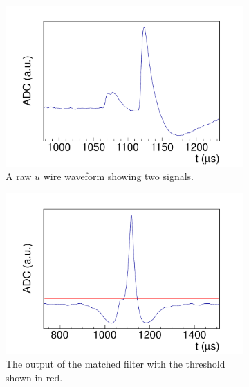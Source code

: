 \documentclass[herrin-thesis.tex]{subfiles}
\begin{document}
\begin{figure}
	\centering
	\begin{subfigure}[b]{0.48\textwidth}
		\centering
		\includegraphics[width=\textwidth]{./plots/data_signal_finding_raw.pdf}
		\caption[Raw \(u\) wire waveform]{A raw \(u\) wire waveform showing two signals.}
		\label{fig:data_signal_finding_raw}
	\end{subfigure}\hfill%
	\begin{subfigure}[b]{0.48\textwidth}
		\centering
		\includegraphics[width=\textwidth]{./plots/data_signal_finding_mf.pdf}
		\caption[Matched filter output]{The output of the matched filter with the threshold shown in red.}
		\label{fig:data_signal_finding_mf}
	\end{subfigure}
		\begin{subfigure}[b]{0.48\textwidth}
		\centering

\end{subfigure}
\end{figure}
\end{document}
